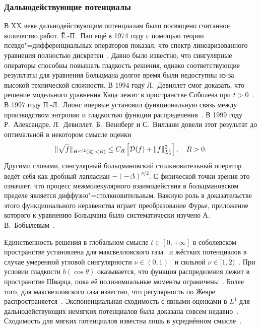\subsubsection{Дальнодействующие потенциалы}

В XX веке дальнодействующим потенциалам было посвящено считанное количество работ.
Ё.-П.~Пао ещё в 1974 году с помощью теории псевдо"=дифференциальных операторов показал,
что спектр линеаризованного уравнения полностью дискретен~\cite{Pao1974}.
Давно было известно, что сингулярные операторы способны повышать гладкость решения,
однако соответствующие результаты для уравнения Больцмана долгое время были недоступны
из-за высокой технической сложности.
В 1994 году Л.~Девиллет смог доказать, что решение модельного уравнения Каца лежит
в пространстве Соболева при \(t>0\)~\cite{Desvillettes1995}.
В 1997 году П.-Л.~Лионс впервые установил функциональную связь между производством энтропии
и гладкостью функции распределения~\cite{Lions1998}.
В 1999 году Р.~Александре, Л.~Девиллет, Б.~Веннберг и С.~Виллани довели этот результат до оптимальной
в некотором смысле оценки~\cite{Alexandre2000}
\begin{equation*}
    \|\sqrt{f}\|_{H^{\nu/2}(|{\boldsymbol{\zeta}}|<R)} \leq C_R \left[ \mathcal{D}(f) + \|f\|^2_{L_2^1} \right], \quad R > 0.
\end{equation*}
Другими словами, сингулярный больцмановский столкновительный оператор ведёт себя
как дробный лапласиан \(-(-\Delta)^{\nu/2}\).
С физической точки зрения это означает, что процесс межмолекулярного взаимодействия в больцмановском пределе
является диффузно"=столкновительным.
Важную роль в доказательстве этого функционального неравенства играет преобразование Фурье,
приложение которого к уравнению Больцмана было систематически изучено А.\,В.~Бобылевым~\cite{Bobylev1984}.

Единственность решения в глобальном смысле \(t\in[0,+\infty]\) в соболевском пространстве установлена
для максвелловского газа~\cite{Toscani1999maxw} и жёстких потенциалов в случае
умеренной угловой сингулярности \(\nu\in(0,1)\)~\cite{Mouhot2009} и сильной \(\nu\in[1,2)\)~\cite{He2012}.
При условии гладкости \(b(\cos\theta)\) оказывается, что функция распределения лежит в пространстве Шварца,
пока её полиномиальные моменты ограничены~\cite{Desvillettes2005, Alexandre2012}.
Более того, для максвелловского газа известно, что регулярность по Жевре распространяется~\cite{Desvillettes2009}.
Экспоненциальная сходимость с явными оценками в \(L^1\) для дальнодействующих немягких потенциалов
была доказана совсем недавно~\cite{Tristani2014, Meng2017}.
Сходимость для мягких потенциалов известна лишь в усреднённом смысле~\cite{Carlen2009}.

